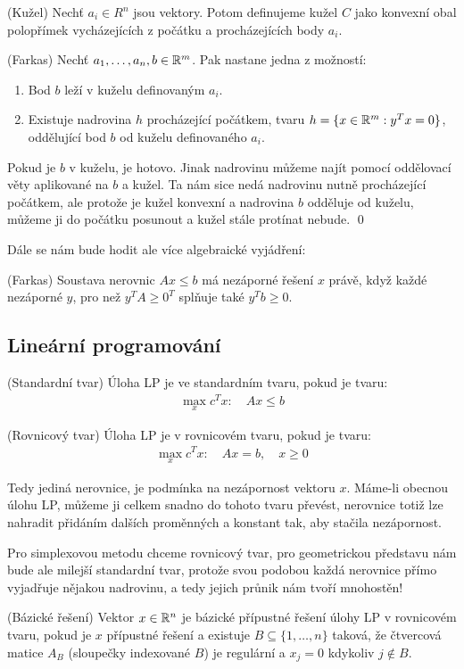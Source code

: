\df (Kužel) Nechť $a_i\in R^n$ jsou vektory. Potom definujeme kužel $C$ jako
konvexní obal polopřímek vycházejících z počátku a procházejících body $a_i$.

\lm (Farkas) Nechť $a_1, \dots, a_n, b \in \mathbb{R}^m$. Pak nastane jedna z možností:
\begin{enumerate}
	\item Bod $b$ leží v kuželu definovaným $a_i$.
	\item Existuje nadrovina $h$ procházející počátkem, tvaru $h = \{x \in \mathbb{R}^m
	: y^Tx = 0\}$, oddělující bod $b$ od kuželu definovaného $a_i$.
\end{enumerate}
\dk Pokud je $b$ v kuželu, je hotovo. Jinak nadrovinu můžeme najít pomocí
oddělovací věty aplikované na $b$ a kužel. Ta nám sice nedá nadrovinu nutně
procházející počátkem, ale protože je kužel konvexní a nadrovina $b$ odděluje
od kuželu, můžeme ji do počátku posunout a kužel stále protínat nebude. \qed

Dále se nám bude hodit ale více algebraické vyjádření:

\lm (Farkas) Soustava nerovnic $Ax \leq b$ má nezáporné řešení $x$ právě, když
každé nezáporné $y$, pro než $y^TA \geq 0^T$ splňuje také $y^Tb \geq 0$.

\subsection{Lineární programování}

\df (Standardní tvar) Úloha LP je ve standardním tvaru, pokud je tvaru:
\begin{align}
	\max_x c^Tx : \quad Ax \leq b
\end{align}

\df (Rovnicový tvar) Úloha LP je v rovnicovém tvaru, pokud je tvaru:
\begin{align}
	\max_x c^Tx : \quad Ax = b, \quad x \geq 0
\end{align}

Tedy jediná nerovnice, je podmínka na nezápornost vektoru $x$. Máme-li obecnou
úlohu LP, můžeme ji celkem snadno do tohoto tvaru převést, nerovnice totiž lze
nahradit přidáním dalších proměnných a konstant tak, aby stačila nezápornost.

Pro simplexovou metodu chceme rovnicový tvar, pro geometrickou představu nám
bude ale milejší standardní tvar, protože svou podobou každá nerovnice přímo
vyjadřuje nějakou nadrovinu, a tedy jejich průnik nám tvoří mnohostěn!

\df (Bázické řešení) Vektor $x \in \mathbb{R}^n$ je bázické přípustné řešení úlohy LP v
rovnicovém tvaru, pokud je $x$ přípustné řešení a existuje $B \subseteq \{1,
\dots, n\}$ taková, že čtvercová matice $A_B$ (sloupečky indexované $B$) je
regulární a $x_j = 0$ kdykoliv $j \notin B$.

